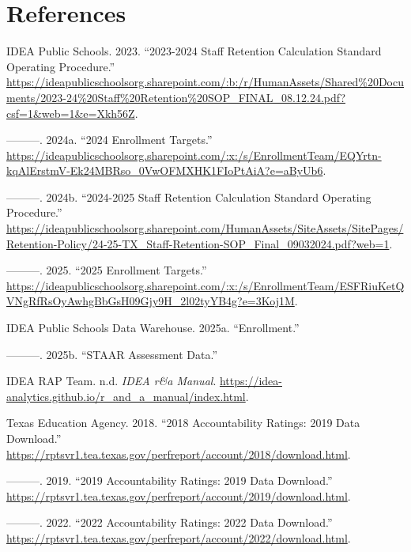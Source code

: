 \documentclass[
  letterpaper,
  DIV=11,
  numbers=noendperiod]{scrreprt}
\newlength{\cslhangindent}
\newenvironment{CSLReferences}[2] %
 {\begin{list}{}{%
  \setlength{\itemindent}{0pt}
  \setlength{\leftmargin}{0pt}
  \setlength{\parsep}{0pt}
  \ifodd #1
   \setlength{\leftmargin}{\cslhangindent}
   \setlength{\itemindent}{-1\cslhangindent}
  \fi
  \setlength{\itemsep}{#2\baselineskip}}}
 {\end{list}}
\begin{document}
\chapter*{References}\label{references}


\label{refs}
\begin{CSLReferences}{1}{0}
IDEA Public Schools. 2023. {``2023-2024 Staff Retention Calculation
Standard Operating Procedure.''}
\url{https://ideapublicschoolsorg.sharepoint.com/:b:/r/HumanAssets/Shared\%20Documents/2023-24\%20Staff\%20Retention\%20SOP_FINAL_08.12.24.pdf?csf=1&web=1&e=Xkh56Z}.

---------. 2024a. {``2024 Enrollment Targets.''}
\url{https://ideapublicschoolsorg.sharepoint.com/:x:/s/EnrollmentTeam/EQYrtn-kqAlErstmV-Ek24MBRso_0VwOFMXHK1FIoPtAiA?e=aByUb6}.

---------. 2024b. {``2024-2025 Staff Retention Calculation Standard
Operating Procedure.''}
\url{https://ideapublicschoolsorg.sharepoint.com/HumanAssets/SiteAssets/SitePages/Retention-Policy/24-25-TX_Staff-Retention-SOP_Final_09032024.pdf?web=1}.

---------. 2025. {``2025 Enrollment Targets.''}
\url{https://ideapublicschoolsorg.sharepoint.com/:x:/s/EnrollmentTeam/ESFRiuKetQVNgRfRsOyAwhgBbGsH09Gjy9H_2l02tyYB4g?e=3Koj1M}.

IDEA Public Schools Data Warehouse. 2025a. {``Enrollment.''}

---------. 2025b. {``STAAR Assessment Data.''}

IDEA RAP Team. n.d. \emph{IDEA r\&a Manual}.
\url{https://idea-analytics.github.io/r_and_a_manual/index.html}.

Texas Education Agency. 2018. {``2018 Accountability Ratings: 2019 Data
Download.''}
\url{https://rptsvr1.tea.texas.gov/perfreport/account/2018/download.html}.

---------. 2019. {``2019 Accountability Ratings: 2019 Data Download.''}
\url{https://rptsvr1.tea.texas.gov/perfreport/account/2019/download.html}.

---------. 2022. {``2022 Accountability Ratings: 2022 Data Download.''}
\url{https://rptsvr1.tea.texas.gov/perfreport/account/2022/download.html}.


\end{CSLReferences}
\end{document}
